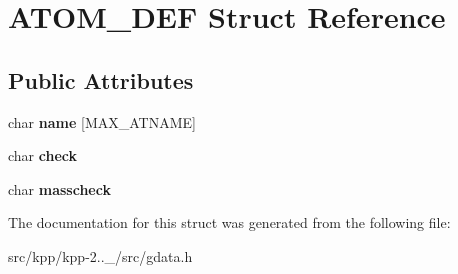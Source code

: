 \hypertarget{structATOM__DEF}{}\section{A\+T\+O\+M\+\_\+\+D\+EF Struct Reference}
\label{structATOM__DEF}
\subsection*{Public Attributes}
\begin{DoxyCompactItemize}
\item 
\mbox{\label{structATOM__DEF_a8f8796dbd0477029995c8263f36d07ae}} 
char {\bfseries name} \mbox{[}M\+A\+X\+\_\+\+A\+T\+N\+A\+ME\mbox{]}
\item 
\mbox{\label{structATOM__DEF_a8276dd478f967cf7de6bc75ddb1a3ec0}} 
char {\bfseries check}
\item 
\mbox{\label{structATOM__DEF_a48a87999aea57e32fc9071d4f2e3e1db}} 
char {\bfseries masscheck}
\end{DoxyCompactItemize}


The documentation for this struct was generated from the following file\+:\begin{DoxyCompactItemize}
\item 
src/kpp/kpp-\/2..\+\_/src/gdata.\+h\end{DoxyCompactItemize}
